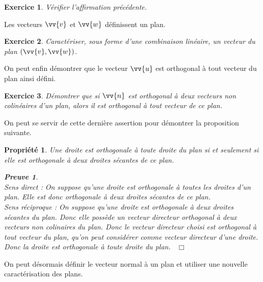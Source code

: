 \documentclass[12pt,a4paper,french]{article}
\theoremstyle{break}
\newtheorem{propriete}{Propriété}
\theoremstyle{plain}
\newtheorem{exercice}{Exercice}
\theoremstyle{nonumberplain}
\newtheorem{preuve}{Preuve}
\theoremstyle{nonumberbreak}
\newcommand{\qed}{~\hfill$\Box$}
\newenvironment{acompleter}{%
  \begin{framed}}
  {\end{framed}%
}
\begin{document}
\begin{acompleter}
  \begin{exercice}
    Vérifier l'affirmation précédente.
    \vspace{3cm}
  \end{exercice}
\end{acompleter}

Les vecteurs $\vv{v}$ et $\vv{w}$ définissent un plan.

\begin{acompleter}
  \begin{exercice} Caractériser, sous forme d'une combinaison linéaire,
    un vecteur du plan $(\vv{v},\vv{w})$.\vspace{1cm}
  \end{exercice}
\end{acompleter}

On peut enfin démontrer que le vecteur $\vv{u}$ est orthogonal à tout
vecteur du plan ainsi défini.

\begin{acompleter}
  \begin{exercice}
    Démontrer que si $\vv{n}$ est orthogonal à deux vecteurs non
    colinéaires d'un plan, alors il est orthogonal à tout vecteur de ce
    plan. \vspace{2cm}
  \end{exercice}
\end{acompleter}

On peut se servir de cette dernière assertion pour démontrer la
proposition suivante.

\begin{propriete}
  Une droite est orthogonale à toute droite du plan si et seulement si
  elle est orthogonale à deux droites sécantes de ce plan.
  \begin{preuve}~\\
    Sens direct : On suppose qu'une droite est orthogonale à toutes les
    droites d'un plan. Elle est donc orthogonale à deux droites sécantes
    de ce plan.\\
    Sens réciproque : On suppose qu'une droite est orthogonale à deux
    droites sécantes du plan. Donc elle possède un vecteur directeur
    orthogonal à deux vecteurs non colinaires du plan. Donc le vecteur
    directeur choisi est orthogonal à tout vecteur du plan, qu'on peut
    considérer comme vecteur directeur d'une droite. Donc la droite est
    orthogonale à toute droite du plan. \qed
  \end{preuve}
\end{propriete}
On peut désormais définir le vecteur normal à un plan et utiliser une
nouvelle caractérisation des plans.
\end{document}

